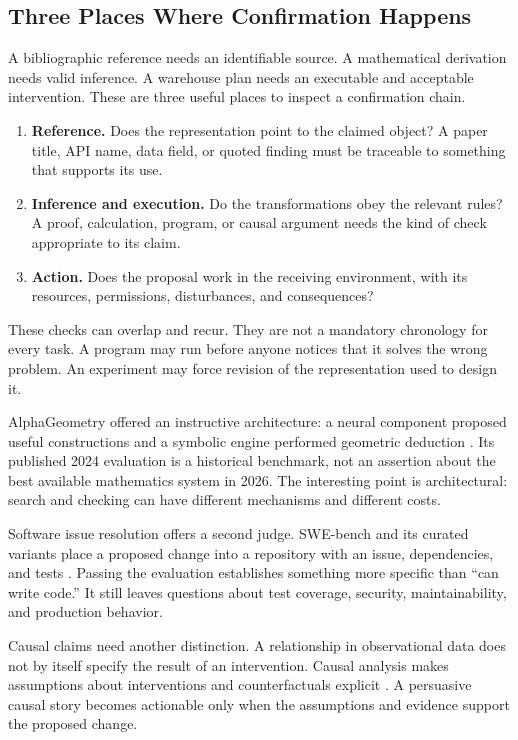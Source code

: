 \subsection{Three Places Where Confirmation Happens}

A bibliographic reference needs an identifiable source. A mathematical derivation needs valid inference. A warehouse plan needs an executable and acceptable intervention. These are three useful places to inspect a confirmation chain.

\begin{enumerate}
 \item \textbf{Reference.} Does the representation point to the claimed object? A paper title, API name, data field, or quoted finding must be traceable to something that supports its use.
 \item \textbf{Inference and execution.} Do the transformations obey the relevant rules? A proof, calculation, program, or causal argument needs the kind of check appropriate to its claim.
 \item \textbf{Action.} Does the proposal work in the receiving environment, with its resources, permissions, disturbances, and consequences?
\end{enumerate}

These checks can overlap and recur. They are not a mandatory chronology for every task. A program may run before anyone notices that it solves the wrong problem. An experiment may force revision of the representation used to design it.

AlphaGeometry offered an instructive architecture: a neural component proposed useful constructions and a symbolic engine performed geometric deduction \cite{trinh2024alphageometry}. Its published 2024 evaluation is a historical benchmark, not an assertion about the best available mathematics system in 2026. The interesting point is architectural: search and checking can have different mechanisms and different costs.

Software issue resolution offers a second judge. SWE-bench and its curated variants place a proposed change into a repository with an issue, dependencies, and tests \cite{swebench2024}. Passing the evaluation establishes something more specific than “can write code.” It still leaves questions about test coverage, security, maintainability, and production behavior.

Causal claims need another distinction. A relationship in observational data does not by itself specify the result of an intervention. Causal analysis makes assumptions about interventions and counterfactuals explicit \cite{pearl2009causality}. A persuasive causal story becomes actionable only when the assumptions and evidence support the proposed change.

